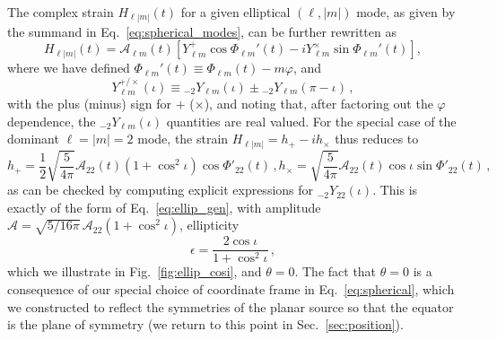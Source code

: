 \documentclass[aps,prd,twocolumn,superscriptaddress,preprintnumbers,floatfix,nofootinbib]{revtex4-2}
\newcommand{\beq}{\begin{equation}}
\newcommand{\eeq}{\end{equation}}
\newcommand*{\eq}[1]{Eq.~\eqref{eq:#1}}
\begin{document}
The complex strain $H_{\ell|m|}(t)$ for a given elliptical $(\ell, |m|)$ mode, as given by the summand in \eq{spherical_modes}, can be further rewritten as
\begin{equation}
H_{\ell|m|}(t) = \mathcal{A}_{\ell m}(t) \left[ Y^+_{\ell m} \cos \Phi_{\ell m}'(t) - 
i Y^\times_{\ell m} \sin \Phi_{\ell m}'(t) \right],
\end{equation}
where we have defined $\Phi_{\ell m}'(t) \equiv \Phi_{\ell m}(t) - m \varphi$, and
\begin{equation}
Y_{\ell m}^{+/\times}(\iota) \equiv {}_{-2} Y_{\ell m}(\iota) \pm {}_{-2} Y_{\ell m}(\pi-\iota) \, ,
\end{equation}
with the plus (minus) sign for $+$ ($\times$), and noting that, after factoring out the $\varphi$ dependence, the ${}_{-2} Y_{\ell m}(\iota)$ quantities are real valued.
For the special case of the dominant $\ell=|m|=2$ mode, the strain $H_{\ell|m|} = h_+ - i h_\times$ thus reduces to
\begin{subequations} \label{eq:nonprecessing}
\beq
h_+ = \frac{1}{2} \sqrt{\frac{5}{4\pi}} \mathcal{A}_{22}(t) \left(1 + \cos^2\iota\right) \cos \Phi'_{22}(t) \, , 
\eeq
\beq
h_\times = \sqrt{\frac{5}{4\pi}} \mathcal{A}_{22}(t)  \cos\iota \sin \Phi'_{22}(t) \, ,
\eeq
\end{subequations}
as can be checked by computing explicit expressions for ${}_{-2} Y_{22}(\iota)$.
This is exactly of the form of \eq{ellip_gen}, with amplitude $\mathcal{A} = \sqrt{5/16\pi}\,\mathcal{A}_{22}\left(1+\cos^2\iota\right)$, ellipticity
\beq \label{eq:ellip_cosi}
\epsilon = \frac{2 \cos\iota}{1+\cos^2\iota}\, ,
\eeq
which we illustrate in Fig.~\ref{fig:ellip_cosi}, and $\theta = 0$.
The fact that $\theta = 0$ is a consequence of our special choice of coordinate frame in \eq{spherical}, which we constructed to reflect the symmetries of the planar source so that the equator is the plane of symmetry (we return to this point in Sec.~\ref{sec:position}).
\end{document}
